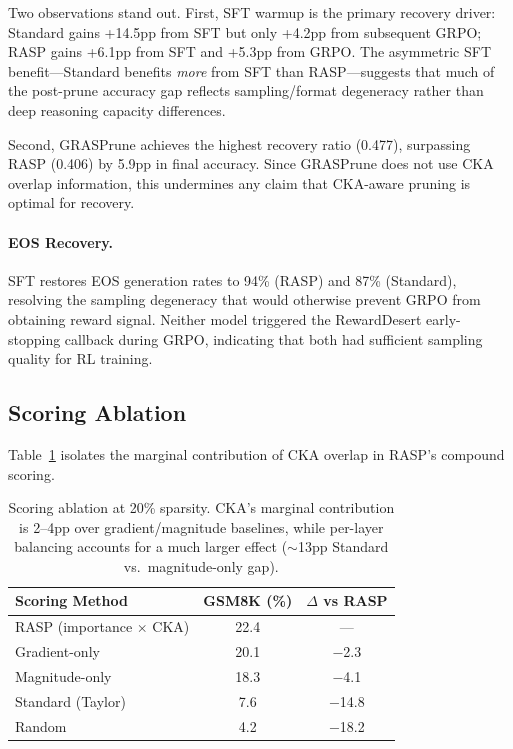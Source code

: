 \documentclass[11pt,a4paper]{article}
\begin{document}
Two observations stand out.
First, SFT warmup is the primary recovery driver: Standard gains +14.5pp from SFT but only +4.2pp from subsequent GRPO; RASP gains +6.1pp from SFT and +5.3pp from GRPO.
The asymmetric SFT benefit---Standard benefits \emph{more} from SFT than RASP---suggests that much of the post-prune accuracy gap reflects sampling/format degeneracy rather than deep reasoning capacity differences.

Second, GRASPrune achieves the highest recovery ratio (0.477), surpassing RASP (0.406) by 5.9pp in final accuracy.
Since GRASPrune does not use CKA overlap information, this undermines any claim that CKA-aware pruning is optimal for recovery.

\paragraph{EOS Recovery.}
SFT restores EOS generation rates to 94\% (RASP) and 87\% (Standard), resolving the sampling degeneracy that would otherwise prevent GRPO from obtaining reward signal.
Neither model triggered the RewardDesert early-stopping callback during GRPO, indicating that both had sufficient sampling quality for RL training.

\subsection{Scoring Ablation}
\label{sec:ablation}

Table~\ref{tab:ablation} isolates the marginal contribution of CKA overlap in RASP's compound scoring.

\begin{table}[t]
\centering
\small
\begin{tabular}{lcc}
\toprule
\textbf{Scoring Method} & \textbf{GSM8K (\%)} & \textbf{$\Delta$ vs RASP} \\
\midrule
RASP (importance $\times$ CKA) & 22.4 & --- \\
Gradient-only & 20.1 & $-$2.3 \\
Magnitude-only & 18.3 & $-$4.1 \\
Standard (Taylor) & 7.6 & $-$14.8 \\
Random & 4.2 & $-$18.2 \\
\bottomrule
\end{tabular}
\caption{Scoring ablation at 20\% sparsity. CKA's marginal contribution is 2--4pp over gradient/magnitude baselines, while per-layer balancing accounts for a much larger effect ($\sim$13pp Standard vs.\ magnitude-only gap).}
\label{tab:ablation}
\end{table}
\end{document}
